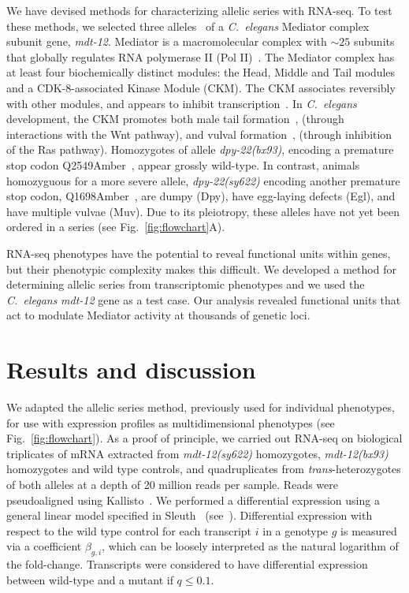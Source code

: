 \documentclass[8pt, twocolumn]{article}
\newcommand{\cel}{\emph{C.~elegans}}
\newcommand{\gene}[1]{\mbox{\emph{#1}}}
\newcommand{\dpy}[1]{\gene{mdt-12#1}}
\newcommand{\bx}{\dpy{(bx93)}}
\newcommand{\sy}{\dpy{(sy622)}}
\begin{document}
We have devised methods for characterizing allelic series with RNA-seq. To test
these methods, we selected three alleles~\cite{Zhang2000,Moghal2003} of a \cel{}
Mediator complex subunit gene, \dpy{}. Mediator is
a macromolecular complex with $\sim25$ subunits~\cite{Jeronimo2017} that
globally regulates RNA polymerase II (Pol II)~\cite{Allen2015,Takagi2006}. The
Mediator complex has at least four biochemically distinct modules: the Head,
Middle and Tail modules and a CDK-8-associated Kinase Module (CKM). The CKM
associates reversibly with other modules, and appears to inhibit
transcription~\cite{Knuesel2009,Elmlund2006}.
In \cel{} development, the CKM promotes both
male tail formation~\cite{Zhang2000}, (through interactions with the Wnt pathway),
and vulval formation~\cite{Moghal2003a}, (through inhibition of the Ras pathway).
Homozygotes of allele \gene{dpy-22(bx93)}, encoding a premature stop codon
Q2549Amber~\cite{Zhang2000}, appear grossly wild-type. In contrast, animals
homozyguous for a more severe allele, \gene{dpy-22(sy622)} encoding another
premature stop codon, Q1698Amber~\cite{Moghal2003}, are dumpy (Dpy), have
egg-laying defects (Egl), and have multiple vulvae (Muv). Due to its pleiotropy,
these alleles have not yet been ordered in a series (see
Fig.~\ref{fig:flowchart}A).

RNA-seq phenotypes have the potential to reveal functional units within genes,
but their phenotypic complexity makes this difficult. We developed a
method for determining allelic series from transcriptomic phenotypes and we used
the \cel{} \dpy{} gene as a test case. Our analysis revealed functional units
that act to modulate Mediator activity at thousands of genetic loci.


\section*{Results and discussion}
We adapted the allelic series method, previously used for individual phenotypes,
for use with expression profiles as multidimensional phenotypes (see
Fig.~\ref{fig:flowchart}).
As a proof of principle, we carried out RNA-seq on biological triplicates of mRNA
extracted from \sy{} homozygotes, \bx{} homozygotes and wild type
controls, and quadruplicates from \emph{trans}-heterozygotes of both alleles at
a depth of 20 million reads per sample. Reads were pseudoaligned using
Kallisto~\cite{Bray2016}. We performed a differential expression using a general
linear model specified in Sleuth~\cite{Pimentel2016a}
(see~). Differential expression with respect to the
wild type control for each transcript $i$ in a genotype $g$ is measured via a
coefficient $\beta_{g, i}$, which can be loosely interpreted as the natural
logarithm of the fold-change. Transcripts were considered to have differential
expression between wild-type and a mutant if $q\leq 0.1$.
\end{document}
